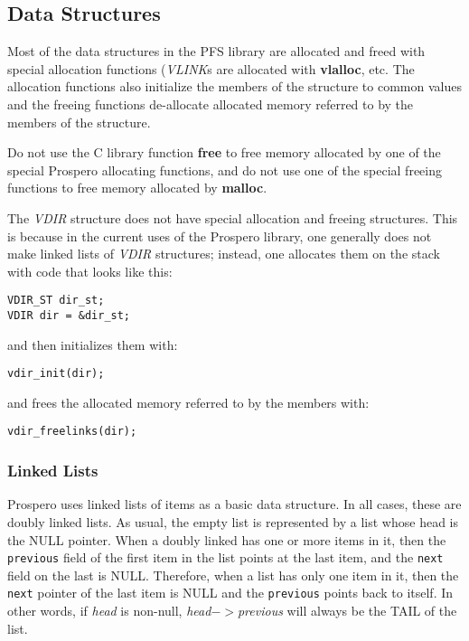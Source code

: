\subsection{Data Structures}

Most of the data structures in the PFS library are allocated and freed
with special allocation functions ({\it VLINK}s are allocated with
{\bf vlalloc}, etc.  The allocation functions also initialize the
members of the structure to common values and the freeing functions
de-allocate allocated memory referred to by the members of
the structure.  

Do not use the C library function {\bf free} to free memory allocated
by one of the special Prospero allocating functions, and do not use
one of the special freeing functions to free memory allocated by {\bf malloc}.

The {\it VDIR} structure does not have special allocation and freeing
structures.  This is because in the current uses of the Prospero
library, one generally does not make linked lists of {\it VDIR}
structures; instead, one allocates them on the stack with code that
looks like this:

\begin{verbatim}
VDIR_ST dir_st;
VDIR dir = &dir_st;
\end{verbatim}
and then initializes them with:
\begin{verbatim}
vdir_init(dir);
\end{verbatim}
and frees the allocated memory referred to by the members with:
\begin{verbatim}
vdir_freelinks(dir);
\end{verbatim}

\subsubsection{Linked Lists}

Prospero uses linked lists of items as a basic data structure.  In all
cases, these are doubly linked lists.  As usual, the empty list is
represented by a list whose head is the NULL pointer.  When a doubly
linked has one or more items in it, then the {\tt previous} field of
the first item in the list points at the last item, and the {\tt next}
field on the last is NULL.  Therefore, when a list has only one item
in it, then the {\tt next} pointer of the last item is NULL and the
{\tt previous} points back to itself.  In other words, if {\it head}
is non-null, {\it head$->$previous} will always be the TAIL of the
list.

